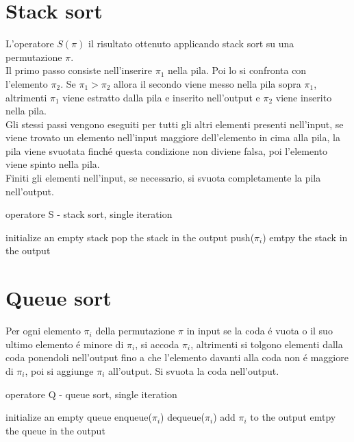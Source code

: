 \section*{Stack sort}
L'operatore $S(\pi)$ il risultato ottenuto applicando stack sort su una permutazione $\pi$.\\
Il primo passo consiste nell'inserire $\pi_1$ nella pila. Poi lo si confronta con l'elemento $\pi_2$. Se $\pi_1>\pi_2$ allora il secondo viene messo nella pila sopra $\pi_1$, altrimenti $\pi_1$ viene estratto dalla pila e inserito nell'output e $\pi_2$ viene inserito nella pila.\\
Gli stessi passi vengono eseguiti per tutti gli altri elementi presenti nell'input, se viene trovato un elemento nell'input maggiore dell'elemento in cima alla pila, la pila viene svuotata finch\'e questa condizione non diviene falsa, poi l'elemento viene spinto nella pila.\\
Finiti gli elementi nell'input, se necessario, si svuota completamente la pila nell'output.
\begin{algorithm}[H]
   \caption{operatore S - stack sort, single iteration }
\begin{algorithmic}
\State initialize an empty stack
   \State pop the stack in the output
   \EndWhile
   \State push($\pi_i$)
   \EndFor
   \State emtpy the stack in the output
\end{algorithmic}
\end{algorithm}
\section*{Queue sort}
Per ogni elemento $\pi_i$ della permutazione $\pi$ in input se la coda \'e vuota o il suo ultimo elemento \'e minore di $\pi_i$, si accoda $\pi_i$, altrimenti si tolgono elementi dalla coda ponendoli nell'output fino a che l'elemento davanti  alla coda non \'e maggiore di $\pi_i$, poi si aggiunge $\pi_i$ all'output.
Si svuota la coda nell'output. 
\begin{algorithm}[H]
   \caption{operatore Q - queue sort, single iteration }
\begin{algorithmic}
\State initialize an empty queue
\State enqueue($\pi_i$)
\Else
{}
\State dequeue($\pi_i$)
\EndWhile
\State add $\pi_i$ to the output
\EndIf
\EndFor
\State emtpy the queue in the output
\end{algorithmic}
\end{algorithm}
